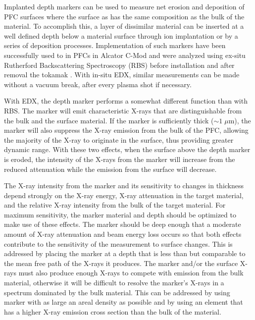 \documentclass[12pt,letterpaper,final]{article}
\begin{document}
Implanted depth markers can be used to measure net erosion and deposition of PFC surfaces where the surface as has the same composition as the bulk of the material. To accomplish this, a layer of dissimilar material can be inserted at a well defined depth below a material surface through ion implantation or by a series of deposition processes. Implementation of such markers have been successfully used to in PFCs in Alcator C-Mod and were analyzed using ex-situ Rutherford Backscattering Spectroscopy (RBS) before installation and after removal the tokamak \cite{Wampler}. With in-situ EDX, similar measurements can be made without a vacuum break, after every plasma shot if necessary. 

With EDX, the depth marker performs a somewhat different function than with RBS. The marker will emit characteristic X-rays that are distinguishable from the bulk and the surface material. If the marker is sufficiently thick ($\sim1\;\mu$m), the marker will also suppress the X-ray emission from the bulk of the PFC, allowing the majority of the X-ray to originate in the surface, thus providing greater dynamic range. With these two effects, when the surface above the depth marker is eroded, the intensity of the X-rays from the marker will increase from the reduced attenuation while the emission from the surface will decrease. 


The X-ray intensity from the marker and its sensitivity to changes in thickness depend strongly on the X-ray energy, X-ray attenuation in the target material, and the relative X-ray intensity from the bulk of the target material. For maximum sensitivity, the marker material and depth should be optimized to make use of these effects. The marker should be deep enough that a moderate amount of X-ray attenuation and beam energy loss occurs so that both effects contribute to the sensitivity of the measurement to surface changes. This is addressed by placing the marker at a depth that is less than but comparable to the mean free path of the X-rays it produces. The marker and/or the surface X-rays must also produce enough X-rays to compete with emission from the bulk material, otherwise it will be difficult to resolve the marker's X-rays in a spectrum dominated by the bulk material. This can be addressed by using marker with as large an areal density as possible and by using an element that has a higher X-ray emission cross section than the bulk of the material.
\end{document}
